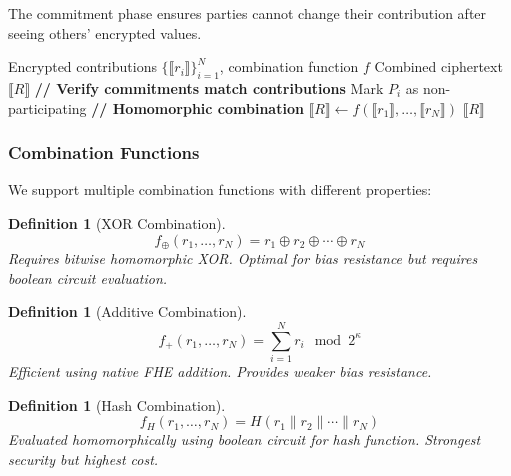 \documentclass[11pt,a4paper]{article}
\newtheorem{definition}[theorem]{Definition}
\begin{document}
The commitment phase ensures parties cannot change their contribution after seeing others' encrypted values.

\begin{algorithm}
\caption{ThresholdRNG: Combination Phase}
\begin{algorithmic}[1]
\Require Encrypted contributions $\{\llbracket r_i \rrbracket\}_{i=1}^N$, combination function $f$
\Ensure Combined ciphertext $\llbracket R \rrbracket$
\State \textbf{// Verify commitments match contributions}
        \State Mark $P_i$ as non-participating
    \EndIf
\EndFor
\State \textbf{// Homomorphic combination}
\State $\llbracket R \rrbracket \gets f(\llbracket r_1 \rrbracket, \ldots, \llbracket r_N \rrbracket)$
\State \Return $\llbracket R \rrbracket$
\end{algorithmic}
\end{algorithm}

\subsubsection{Combination Functions}

We support multiple combination functions with different properties:

\begin{definition}[XOR Combination]
\begin{equation}
f_{\oplus}(r_1, \ldots, r_N) = r_1 \oplus r_2 \oplus \cdots \oplus r_N
\end{equation}
Requires bitwise homomorphic XOR. Optimal for bias resistance but requires boolean circuit evaluation.
\end{definition}

\begin{definition}[Additive Combination]
\begin{equation}
f_{+}(r_1, \ldots, r_N) = \sum_{i=1}^N r_i \mod 2^{\kappa}
\end{equation}
Efficient using native FHE addition. Provides weaker bias resistance.
\end{definition}

\begin{definition}[Hash Combination]
\begin{equation}
f_H(r_1, \ldots, r_N) = H(r_1 \| r_2 \| \cdots \| r_N)
\end{equation}
Evaluated homomorphically using boolean circuit for hash function. Strongest security but highest cost.
\end{definition}
\end{document}
